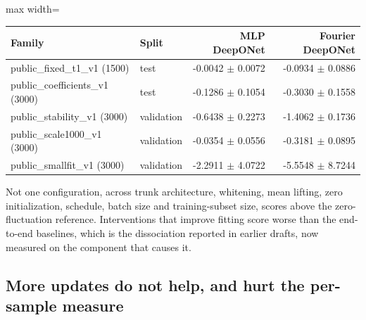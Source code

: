 \documentclass[preprint,12pt]{elsarticle}
\begin{document}
\begin{center}
\begin{adjustbox}{max width=\linewidth}
\small
\begin{tabular}{llrr}
\toprule
Family & Split & MLP DeepONet & Fourier DeepONet \\
\midrule
public\_fixed\_t1\_v1 (1500) & test & -0.0042 $\pm$ 0.0072 & -0.0934 $\pm$ 0.0886 \\
public\_coefficients\_v1 (3000) & test & -0.1286 $\pm$ 0.1054 & -0.3030 $\pm$ 0.1558 \\
public\_stability\_v1 (3000) & validation & -0.6438 $\pm$ 0.2273 & -1.4062 $\pm$ 0.1736 \\
public\_scale1000\_v1 (3000) & validation & -0.0354 $\pm$ 0.0556 & -0.3181 $\pm$ 0.0895 \\
public\_smallfit\_v1 (3000) & validation & -2.2911 $\pm$ 4.0722 & -5.5548 $\pm$ 8.7244 \\
\bottomrule
\end{tabular}
\end{adjustbox}
\end{center}


Not one configuration, across trunk architecture, whitening, mean lifting, zero initialization, schedule, batch size and training-subset size, scores above the zero-fluctuation reference. Interventions that improve fitting score worse than the end-to-end baselines, which is the dissociation reported in earlier drafts, now measured on the component that causes it.

\subsection{More updates do not help, and hurt the per-sample measure}
\end{document}
